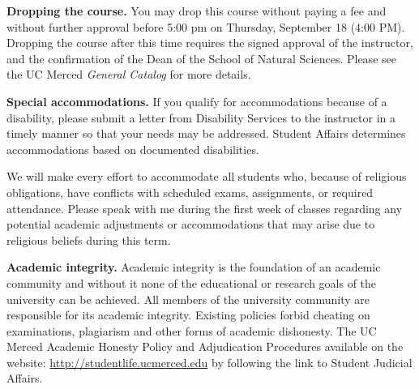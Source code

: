 \documentclass[11pt]{article}
\newcommand{\secskip}{\vspace{6pt}}
\begin{document}
\begin{description}

\item \textbf{Dropping the course.} You may drop this course without
  paying a fee and without further approval before 5:00 pm on
  Thursday, September 18 (4:00 PM).  Dropping the course after this time
  requires the signed approval of the instructor, and the confirmation
  of the Dean of the School of Natural Sciences. Please see the UC
  Merced \textit{General Catalog} for more details.

\secskip

\item \textbf{Special accommodations.} If you qualify for
  accommodations because of a disability, please submit a letter from
  Disability Services to the instructor in a timely manner so that
  your needs may be addressed.  Student Affairs determines
  accommodations based on documented disabilities.

  We will make every effort to accommodate all students who, because
  of religious obligations, have conflicts with scheduled exams,
  assignments, or required attendance.  Please speak with me during
  the first week of classes regarding any potential academic
  adjustments or accommodations that may arise due to religious
  beliefs during this term.

\secskip

\item \textbf{Academic integrity.}  Academic integrity is the
  foundation of an academic community and without it none of the
  educational or research goals of the university can be achieved.
  All members of the university community are responsible for its
  academic integrity.  Existing policies forbid cheating on
  examinations, plagiarism and other forms of academic dishonesty.
  The UC Merced Academic Honesty Policy and Adjudication Procedures
  available on the website: \url{http://studentlife.ucmerced.edu} by
  following the link to Student Judicial Affairs.

\end{description}

\clearpage
\end{document}

